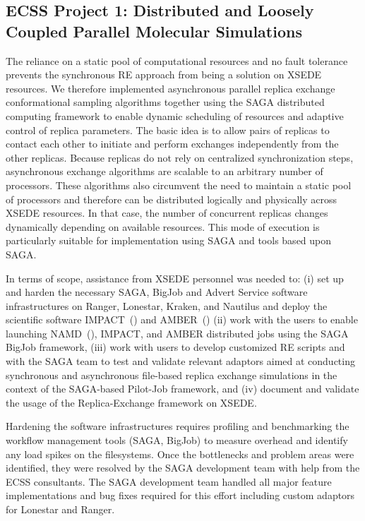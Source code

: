 \documentclass{sig-alternate}
\begin{document}
\subsection{ECSS Project 1: Distributed and Loosely Coupled Parallel
  Molecular Simulations}

The reliance on a static pool of computational resources and no
fault tolerance prevents the synchronous RE approach from being a
solution on XSEDE resources. We therefore implemented asynchronous
parallel replica exchange conformational sampling algorithms together
using the SAGA distributed computing framework to enable dynamic
scheduling of resources and adaptive control of replica
parameters. The basic idea is to allow pairs of replicas to contact
each other to initiate and perform exchanges independently from the
other replicas. Because replicas do not rely on centralized
synchronization steps, asynchronous exchange algorithms are scalable to an
arbitrary number of processors. These algorithms also circumvent
the need to maintain a static pool of processors and therefore
can be distributed logically and physically across XSEDE resources.
In that case, the number of concurrent replicas changes dynamically
depending on available resources. This mode of execution is particularly
suitable for implementation using SAGA and tools based upon SAGA.

In terms of scope, assistance from XSEDE personnel was needed to: (i) set up and
harden the necessary SAGA, BigJob and Advert Service software infrastructures on
Ranger, Lonestar, Kraken, and Nautilus and deploy the scientific software
IMPACT~(\cite{IMPACT}) and AMBER~(\cite{AMBER}) (ii) work with the
users to enable launching NAMD~(\cite{NAMD}), 
IMPACT, and AMBER distributed jobs using the
SAGA BigJob framework, (iii) work with users to develop customized RE scripts
and with the SAGA team to test and validate relevant adaptors aimed at
conducting synchronous and asynchronous ﬁle-based replica exchange simulations
in the context of the SAGA-based Pilot-Job framework, and (iv)  document and
validate the usage of the Replica-Exchange framework on XSEDE.

Hardening the software infrastructures requires profiling and benchmarking the
workflow management tools (SAGA, BigJob) to measure overhead and identify any
load spikes on the filesystems. Once the bottlenecks and problem areas were
identified, they were resolved by the SAGA development team with help from
the ECSS consultants. The SAGA development team handled all major feature
implementations and bug fixes required for this effort including custom
adaptors for Lonestar and Ranger. 
\end{document}
